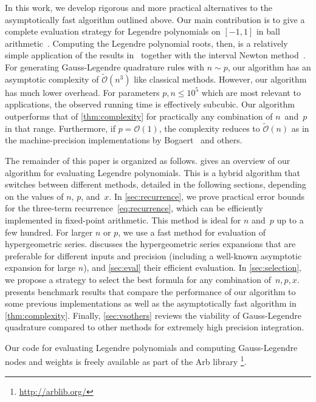 \documentclass[nohypdvips,review]{siamart0216}
\newcommand{\OO}{\mathcal{O}}
\newcommand{\OOtilde}{\widetilde{\mathcal{O}}}
\begin{document}
In this work, we develop rigorous and more practical alternatives to the
asymptotically fast algorithm outlined above.
Our main contribution is to give a complete evaluation strategy
for Legendre polynomials on $[-1,1]$ in ball arithmetic~\cite{vdH:ball,Johansson2017arb}.
Computing the Legendre polynomial roots, then,
is a relatively simple application of the results
in~\cite{petras1999computation} together with
the interval Newton method~\cite{moore1979methods}.
For generating Gauss-Legendre quadrature rules with $n \sim p$,
our algorithm has an asymptotic complexity of $\OOtilde(n^3)$ like
classical methods. However, our algorithm has much lower overhead.
For parameters $p, n \leq 10^5$ which are most relevant to
applications, the observed running time is effectively subcubic.
Our algorithm outperforms that of \cref{thm:complexity} for
practically any combination of $n$~and~$p$ in that range.
Furthermore, if $p = \OO(1)$, the complexity reduces to $\OOtilde(n)$
as in the machine-precision implementations by
Bogaert~\cite{bogaert2014iteration} and others.

The remainder of this paper is organized as follows.
 gives an overview of our algorithm for evaluating
Legendre polynomials.
This is a hybrid algorithm that switches between different methods,
detailed in the following sections, depending on the values of $n$, $p$,
and~$x$.
In \cref{sec:recurrence}, we prove practical error bounds for
the three-term recurrence~\cref{eq:recurrence}, which can be
efficiently implemented in fixed-point arithmetic.
This method is ideal for $n$ and~$p$ up to a few hundred.
For larger $n$ or $p$, we use a fast method for evaluation
of hypergeometric series.
 discusses the hypergeometric series
expansions that are preferable for different inputs and precision
(including a well-known asymptotic expansion for large $n$),
and \cref{sec:eval} their efficient evaluation.
In \cref{sec:selection}, we propose a strategy to select the
best formula for any combination of~$n, p, x$.
 presents benchmark results that compare the performance
of our algorithm to some previous implementations as well as the
asymptotically fast algorithm in \cref{thm:complexity}.
Finally, \cref{sec:vsothers} reviews the viability of Gauss-Legendre
quadrature compared to other methods
for extremely high precision integration.

Our code for evaluating Legendre polynomials and computing
Gauss-Legendre nodes and weights is freely available as part of
the Arb library \cite{Johansson2017arb}%
\footnote{\url{http://arblib.org/}}.
\end{document}
